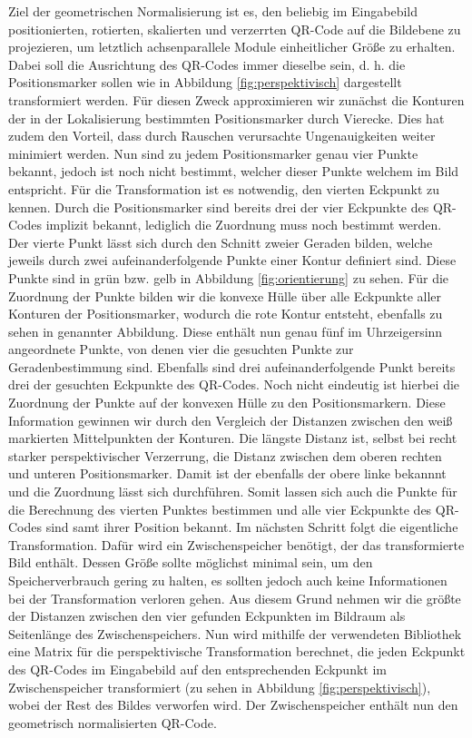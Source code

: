 \documentclass[a4paper, oneside, 12pt]{article}
\begin{document}
Ziel der geometrischen Normalisierung ist es, den beliebig im Eingabebild positionierten, rotierten, skalierten und verzerrten QR-Code auf die Bildebene zu projezieren, um letztlich achsenparallele Module einheitlicher Größe zu erhalten.
Dabei soll die Ausrichtung des QR-Codes immer dieselbe sein, d. h. die Positionsmarker sollen wie in Abbildung \ref{fig:perspektivisch} dargestellt transformiert werden.
Für diesen Zweck approximieren wir zunächst die Konturen der in der Lokalisierung bestimmten Positionsmarker durch Vierecke. Dies hat zudem den Vorteil, dass durch Rauschen verursachte Ungenauigkeiten weiter minimiert werden. Nun sind zu jedem Positionsmarker genau vier Punkte bekannt, jedoch ist noch nicht bestimmt, welcher dieser Punkte welchem im Bild entspricht. Für die Transformation ist es notwendig, den vierten Eckpunkt zu kennen. Durch die Positionsmarker sind bereits drei der vier Eckpunkte des QR-Codes implizit bekannt, lediglich die Zuordnung muss noch bestimmt werden. Der vierte Punkt lässt sich durch den Schnitt zweier Geraden bilden, welche jeweils durch zwei aufeinanderfolgende Punkte einer Kontur definiert sind. Diese Punkte sind in grün bzw. gelb in Abbildung \ref{fig:orientierung} zu sehen.
Für die Zuordnung der Punkte bilden wir die konvexe Hülle über alle Eckpunkte aller Konturen der Positionsmarker, wodurch die rote Kontur entsteht, ebenfalls zu sehen in genannter Abbildung. Diese enthält nun genau fünf im Uhrzeigersinn angeordnete Punkte, von denen vier die gesuchten Punkte zur Geradenbestimmung sind. Ebenfalls sind drei aufeinanderfolgende Punkt bereits drei der gesuchten Eckpunkte des QR-Codes. Noch nicht eindeutig ist hierbei die Zuordnung der Punkte auf der konvexen Hülle zu den Positionsmarkern. Diese Information gewinnen wir durch den Vergleich der Distanzen zwischen den weiß markierten Mittelpunkten der Konturen. Die längste Distanz ist, selbst bei recht starker perspektivischer Verzerrung, die Distanz zwischen dem oberen rechten und unteren Positionsmarker. Damit ist der ebenfalls der obere linke bekannnt und die Zuordnung lässt sich durchführen. Somit lassen sich auch die Punkte für die Berechnung des vierten Punktes bestimmen und alle vier Eckpunkte des QR-Codes sind samt ihrer Position bekannt.
Im nächsten Schritt folgt die eigentliche Transformation.
Dafür wird ein Zwischenspeicher benötigt, der das transformierte Bild enthält. Dessen Größe sollte möglichst minimal sein, um den Speicherverbrauch gering zu halten, es sollten jedoch auch keine Informationen bei der Transformation verloren gehen. Aus diesem Grund nehmen wir die größte der Distanzen zwischen den vier gefunden Eckpunkten im Bildraum als Seitenlänge des Zwischenspeichers.
Nun wird mithilfe der verwendeten Bibliothek eine Matrix für die perspektivische Transformation berechnet, die jeden Eckpunkt des QR-Codes im Eingabebild auf den entsprechenden Eckpunkt im Zwischenspeicher transformiert (zu sehen in Abbildung \ref{fig:perspektivisch}), wobei der Rest des Bildes verworfen wird.
Der Zwischenspeicher enthält nun den geometrisch normalisierten QR-Code.
\end{document}
